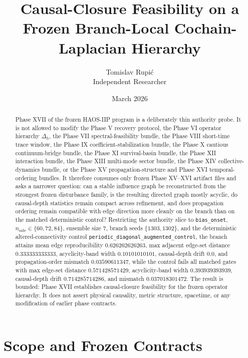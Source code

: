 \documentclass[11pt]{article}
\title{Causal-Closure Feasibility on a Frozen Branch-Local Cochain-Laplacian Hierarchy}
\author{Tomislav Rupi\'c \\ Independent Researcher}
\date{March 2026}
\begin{document}
\maketitle

\begin{abstract}
Phase XVII of the frozen HAOS-IIP program is a deliberately thin authority probe. It is not allowed to modify the Phase V recovery protocol, the Phase VI operator hierarchy $\Delta_h$, the Phase VII spectral-feasibility bundle, the Phase VIII short-time trace window, the Phase IX coefficient-stabilization bundle, the Phase X cautious continuum-bridge bundle, the Phase XI survival-basin bundle, the Phase XII interaction bundle, the Phase XIII multi-mode sector bundle, the Phase XIV collective-dynamics bundle, or the Phase XV propagation-structure and Phase XVI temporal-ordering bundles. It therefore consumes only frozen Phase XV--XVI artifact files and asks a narrower question: can a stable influence graph be reconstructed from the strongest frozen disturbance family, is the resulting directed graph mostly acyclic, do causal-depth statistics remain compact across refinement, and does propagation ordering remain compatible with edge direction more cleanly on the branch than on the matched deterministic control? Restricting the authority slice to \texttt{bias\_onset}, $n_{\mathrm{side}} \in \{60,72,84\}$, ensemble size $7$, branch seeds $\{1303,1302\}$, and the deterministic altered-connectivity control \texttt{periodic\_diagonal\_augmented\_control}, the branch attains mean edge reproducibility $0.626262626263$, max adjacent edge-set distance $0.333333333333$, acyclicity-band width $0.10101010101$, causal-depth drift $0.0$, and propagation-order mismatch $0.03590611347$, while the control fails all matched gates with max edge-set distance $0.571428571429$, acyclicity-band width $0.393939393939$, causal-depth drift $0.714285714286$, and mismatch $0.037018301472$. The result is bounded: Phase XVII establishes causal-closure feasibility for the frozen operator hierarchy. It does not assert physical causality, metric structure, spacetime, or any modification of earlier phase contracts.
\end{abstract}

\section{Scope and Frozen Contracts}
\end{document}
